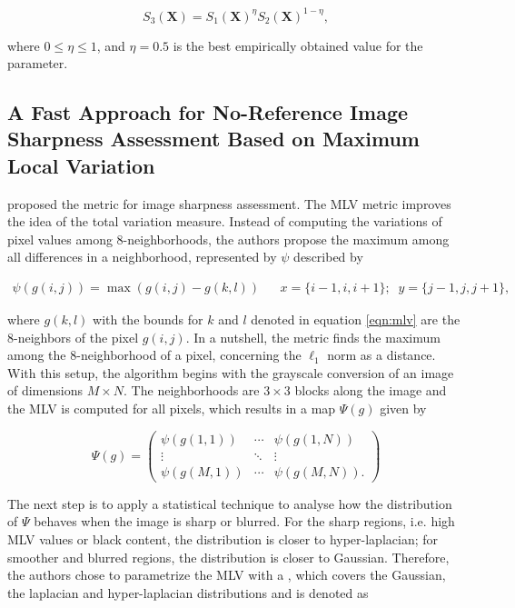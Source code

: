 \begin{equation}
\label{eqn:s3_index}
S_{3}(\mathbf{X}) = S_{1}(\mathbf{X})^{\eta} S_{2}(\mathbf{X})^{1 - \eta},
\end{equation}

\noindent where $0 \leq \eta \leq 1$, and $\eta = 0.5$ is the best empirically obtained value for the parameter.

\subsection{A Fast Approach for No-Reference Image Sharpness Assessment Based on Maximum Local Variation}

 proposed the  metric for image sharpness assessment. The MLV metric improves the idea of the total variation measure. Instead of computing the variations of pixel values among 8-neighborhoods, the authors propose the maximum among all differences in a neighborhood, represented by $\psi$ described by

\begin{align}
\label{eqn:mlv}
\psi(g(i,j)) = \max(g(i,j) - g(k,l))
&&
x = \{i - 1, i, i + 1\};\;\;
y = \{j - 1, j, j + 1\},
\end{align}

\noindent where $g(k,l)$ with the bounds for $k$ and $l$ denoted in equation \ref{eqn:mlv} are the 8-neighbors of the pixel $g(i,j)$. In a nutshell, the metric finds the maximum among the 8-neighborhood of a pixel, concerning the $\ell_{1}$ norm as a distance. With this setup, the algorithm begins with the grayscale conversion of an image of dimensions $M \times N$. The neighborhoods are $3 \times 3$ blocks along the image and the MLV is computed for all pixels, which results in a map $\Psi(g)$ given by

\begin{equation}
\label{eqn:mlv_matrix}
\Psi(g) =
    \begin{pmatrix}
        \psi(g(1,1)) & \cdots &  \psi(g(1,N))\\
        \vdots & \ddots & \vdots\\
        \psi(g(M,1)) & \cdots & \psi(g(M,N)).
    \end{pmatrix}
\end{equation}

\noindent The next step is to apply a statistical technique to analyse how the distribution of $\Psi$ behaves when the image is sharp or blurred. For the sharp regions, i.e. high MLV values or black content, the distribution is closer to hyper-laplacian; for smoother and blurred regions, the distribution is closer to Gaussian. Therefore, the authors chose to parametrize the MLV with a , which covers the Gaussian, the laplacian and hyper-laplacian distributions and is denoted as

